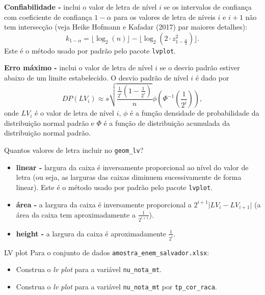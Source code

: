\documentclass[
  10pt,
  ignorenonframetext,
]{beamer}
\providecommand{\tightlist}{%
  \setlength{\itemsep}{0pt}\setlength{\parskip}{0pt}}\usepackage{longtable,booktabs,array}
\newcommand*{\destaque}[1]{%
    \colorbox{cabecalho}{\textcolor{titulo}{#1}}
}
\begin{document}
\begin{frame}[fragile]
\textbf{Confiabilidade -} inclui o valor de letra de nível \(i\) se os
intervalos de confiança com coeficiente de confiança \(1-\alpha\) para
os valores de letra de níveis \(i\) e \(i+1\) não tem intersecção (veja
Heike Hofmann e Kafadar (2017) par maiores detalhes):
\[k_{1-\alpha} = \lfloor \log_2(n) \rfloor - \lfloor \log_2(2\cdot z_{1-\frac{\alpha}{2}}^2) \rfloor.\]
Este é o método usado por padrão pelo pacote \texttt{lvplot}.

\textbf{Erro máximo -} inclui o valor de letra de nível \(i\) se o
desvio padrão estiver abaixo de um limite estabelecido. O desvio padrão
de nível \(i\) é dado por
\[DP(LV_i) \approx s \sqrt{\frac{\frac{1}{2^i}\left(1 - \frac{1}{2^i}\right)}{n}}\phi\left(\Phi^{-1}\left(\frac{1}{2^i}\right)\right),\]
onde \(LV_i\) é o valor de letra de nível \(i\), \(\phi\) é a função
densidade de probabilidade da distribuição normal padrão e \(\Phi\) é a
função de distribuição acumulada da distribuição normal padrão.
\end{frame}

\begin{frame}[fragile]
\destaque{Quantos valores de letra incluir no \texttt{geom\_lv}?}

\begin{itemize}
\tightlist
\item
  \textbf{linear -} largura da caixa é inversamente proporcional ao
  nível do valor de letra (ou seja, as larguras das caixas diminuem
  sucessivamente de forma linear). Este é o método usado por padrão pelo
  pacote \texttt{lvplot}.
\item
  \textbf{área -} a largura da caixa é inversamente proporcional a
  \(2^{i+1}\lvert LV_i - LV_{i+1} \rvert\) (a área da caixa tem
  aproximadamente a \(\frac{1}{2^{i+1}}\)).
\item
  \textbf{height -} a largura da caixa é aproximadamente
  \(\frac{1}{2^i}\).
\end{itemize}
\end{frame}

\begin{frame}[fragile]{LV plot}
\protect\hypertarget{lv-plot-3}{}
Para o conjunto de dados \texttt{amostra\_enem\_salvador.xlsx}:

\begin{itemize}
\tightlist
\item
  Construa o \emph{lv plot} para a variável \texttt{nu\_nota\_mt}.
\item
  Construa o \emph{lv plot} para a variável \texttt{nu\_nota\_mt} por
  \texttt{tp\_cor\_raca}.
\end{itemize}
\end{frame}
\end{document}
